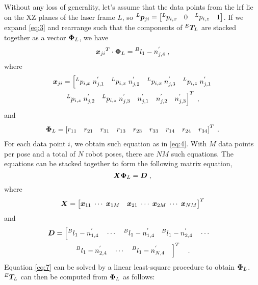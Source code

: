 Without any loss of generality, let's assume that the data points from the \ac{lrf} lie on the XZ planes of the laser frame $L$, so ${^L}\vb*{p}_{ji} = \left[{^L}p_{i,x} \quad 0 \quad {^L}p_{i,z}\quad 1\right]$. If we expand \eqref{eq:3} and rearrange such that the components of ${^E}\vb*{T}_L$ are stacked together as a vector $\vb*{\Phi}_L$, we have
\begin{equation}
\label{eq:4}
  {\vb*{x}_{ji}}^T \cdot \vb*{\Phi}_L = {^B}l_1 -  n^{'}_{j,4} \; , 
\end{equation}
where 
\begin{multline}
  \vb*{x}_{ji} = \left[{^L}p_{i,x}\;n^{'}_{j,1} \quad {^L}p_{i,x}\;n^{'}_{j,2}\quad {^L}p_{i,x}\;n^{'}_{j,3}\quad  {^L}p_{i,z}\;n^{'}_{j,1}\right. \\ 
\left. {^L}p_{i,z}\;n^{'}_{j,2}\quad {^L}p_{i,z}\;n^{'}_{j,3} \quad n^{'}_{j,1} \quad n^{'}_{j,2} \quad n^{'}_{j,3} \right]^T \; , 
\end{multline}
and
\begin{multline}
  \vb*{\Phi}_L= \left[r_{11} \quad r_{21} \quad r_{31} \quad r_{13} \quad r_{23} \quad r_{33} \quad r_{14} \quad r_{24}  \quad r_{34} \right] ^T \; .
\end{multline}
For each data point $i$, we obtain such equation as in \eqref{eq:4}. With $M$ data points per pose and a total of $N$ robot poses, there are $NM$ such equations. The equations can be stacked together to form the following matrix equation,
\begin{equation}
\label{eq:7}
  \vb*{X}   \vb*{\Phi}_L= \vb*{D} \; ,
\end{equation}
where 
\begin{equation}
\vb*{X} =\begin{bmatrix}
{\vb*{x}_{11}} \; \cdots \;{\vb*{x}_{1M}}\quad  {\vb*{x}_{21}} \; \cdots \; {\vb*{x}_{2M}}\;  \cdots \; {\vb*{x}_{NM}} 
\end{bmatrix}^T 
\end{equation}
and 
\begin{multline}
\vb*{D} =\left[
{^B}l_1 -  n^{'}_{1,4} \quad
\cdots \quad
{^B}l_1 -  n^{'}_{1,4} \quad
{^B}l_1 -  n^{'}_{2,4} \quad
\cdots  \quad
\right. \\
\left.
{^B}l_1 -  n^{'}_{2,4} \quad
\cdots \quad
{^B}l_1 -  n^{'}_{N,4} \quad  
\right]^T \quad .
\end{multline}
Equation \eqref{eq:7} can be solved by a linear least-square procedure to obtain $\vb*{\Phi}_L$. ${^E}\vb*{T}_L$ can then be computed from $\vb*{\Phi}_L$ as follows:
